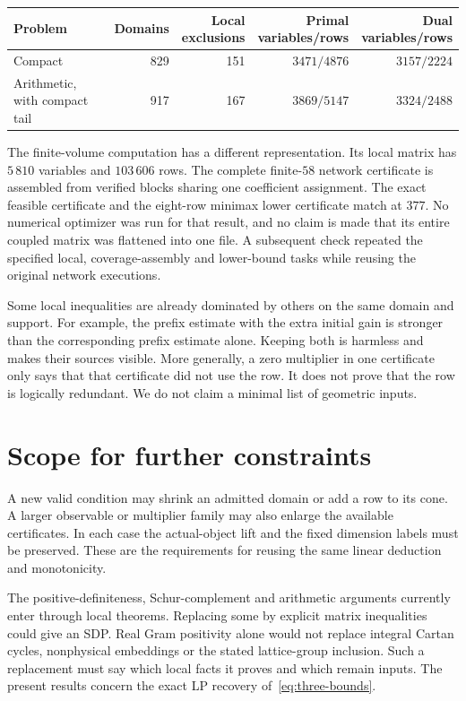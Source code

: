 \documentclass[11pt]{article}
\theoremstyle{definition}
\theoremstyle{remark}
\numberwithin{equation}{section}
\begin{document}
\begin{center}\small
\begin{tabular}{lrrrr}
\toprule
Problem&Domains&\shortstack{Local\\exclusions}&
\shortstack{Primal\\variables/rows}&\shortstack{Dual\\variables/rows}\\
\midrule
Compact&829&151&$3471/4876$&$3157/2224$\\
\shortstack[l]{Arithmetic,\\with compact tail}&917&167&$3869/5147$&$3324/2488$\\
\bottomrule
\end{tabular}
\end{center}
The finite-volume computation has a different representation. Its
local matrix has $5\,810$ variables and $103\,606$ rows. The complete
finite-$58$ network certificate is assembled from verified blocks
sharing one coefficient assignment. The exact feasible certificate
and the eight-row minimax lower certificate match at $377$. No
numerical optimizer was run for that result, and no claim is made
that its entire coupled matrix was flattened into one file. A
subsequent check repeated the specified local, coverage-assembly
and lower-bound tasks while reusing the original network executions.

Some local inequalities are already dominated by others on the same
domain and support. For example, the prefix estimate with the extra
initial gain is stronger than the corresponding prefix estimate
alone. Keeping both is harmless and makes their sources visible.
More generally, a zero multiplier in one certificate only says that
that certificate did not use the row. It does not prove that the row
is logically redundant. We do not claim a minimal list of geometric
inputs.

\section{Scope for further constraints}
\label{sec:strengthening}

A new valid condition may shrink an admitted domain or add a row to
its cone. A larger observable or multiplier family may also enlarge
the available certificates. In each case the actual-object lift and
the fixed dimension labels must be preserved. These are the
requirements for reusing the same linear deduction and monotonicity.

The positive-definiteness, Schur-complement and arithmetic arguments
currently enter through local theorems. Replacing some by explicit
matrix inequalities could give an SDP. Real Gram positivity alone
would not replace integral Cartan cycles, nonphysical embeddings or
the stated lattice-group inclusion. Such a replacement must say which
local facts it proves and which remain inputs. The present results
concern the exact LP recovery of~\eqref{eq:three-bounds}.
\end{document}
